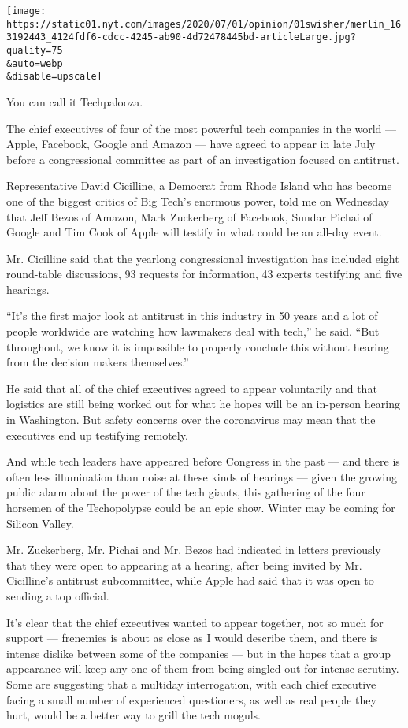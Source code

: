 \texttt{[image: https://static01.nyt.com/images/2020/07/01/opinion/01swisher/merlin\_163192443\_4124fdf6-cdcc-4245-ab90-4d72478445bd-articleLarge.jpg?quality=75\\\&auto=webp\\\&disable=upscale]}

You can call it Techpalooza.

The chief executives of four of the most powerful tech companies in the
world --- Apple, Facebook, Google and Amazon --- have agreed to appear
in late July before a congressional committee as part of an
investigation focused on antitrust.

Representative David Cicilline, a Democrat from Rhode Island who has
become one of the biggest critics of Big Tech's enormous power, told me
on Wednesday that Jeff Bezos of Amazon, Mark Zuckerberg of Facebook,
Sundar Pichai of Google and Tim Cook of Apple will testify in what could
be an all-day event.

Mr. Cicilline said that the yearlong congressional investigation has
included eight round-table discussions, 93 requests for information, 43
experts testifying and five hearings.

``It's the first major look at antitrust in this industry in 50 years
and a lot of people worldwide are watching how lawmakers deal with
tech,'' he said. ``But throughout, we know it is impossible to properly
conclude this without hearing from the decision makers themselves.''

He said that all of the chief executives agreed to appear voluntarily
and that logistics are still being worked out for what he hopes will be
an in-person hearing in Washington. But safety concerns over the
coronavirus may mean that the executives end up testifying remotely.

And while tech leaders have appeared before Congress in the past --- and
there is often less illumination than noise at these kinds of hearings
--- given the growing public alarm about the power of the tech giants,
this gathering of the four horsemen of the Techopolypse could be an epic
show. Winter may be coming for Silicon Valley.

Mr. Zuckerberg, Mr. Pichai and Mr. Bezos had indicated in letters
previously that they were open to appearing at a hearing, after being
invited by Mr. Cicilline's antitrust subcommittee, while Apple had said
that it was open to sending a top official.

It's clear that the chief executives wanted to appear together, not so
much for support --- frenemies is about as close as I would describe
them, and there is intense dislike between some of the companies --- but
in the hopes that a group appearance will keep any one of them from
being singled out for intense scrutiny. Some are suggesting that a
multiday interrogation, with each chief executive facing a small number
of experienced questioners, as well as real people they hurt, would be a
better way to grill the tech moguls.

